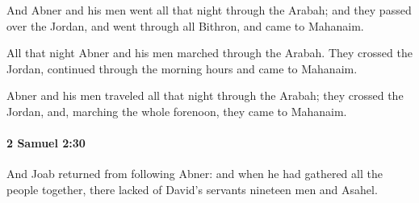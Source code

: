 			\begin{versebox}
					\item[BHS] 
					\item[ASV] And Abner and his men went all that night through the Arabah; and they passed over the Jordan, and went through all Bithron, and came to Mahanaim.
					\item[NIV] All that night Abner and his men marched through the Arabah. They crossed the Jordan, continued through the morning hours and came to Mahanaim.
					\item[NRSV] Abner and his men traveled all that night through the Arabah; they crossed the Jordan, and, marching the whole forenoon, they came to Mahanaim.
			\end{versebox}

		\paragraph{2 Samuel 2:30} %
			\label{2SAMUEL-2-30}

			And Joab returned from following Abner: and when he had gathered all the people together, there lacked of David’s servants nineteen men and Asahel.


